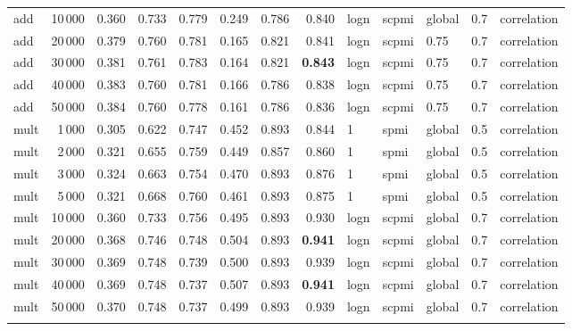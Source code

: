 \begin{tabular}{lrrrrrrrlllll}
     add &           10\,000 &      0.360 &  0.733 &  0.779 &  0.249 &      0.786 &      0.840 &  logn &  scpmi &  global &  0.7 &    correlation \\
     add &           20\,000 &      0.379 &  0.760 &  0.781 &  0.165 &      0.821 &      0.841 &  logn &  scpmi &    0.75 &  0.7 &    correlation \\
     add &           30\,000 &      0.381 &  0.761 &  0.783 &  0.164 &      0.821 &      \textbf{0.843} &  logn &  scpmi &    0.75 &  0.7 &    correlation \\
     add &           40\,000 &      0.383 &  0.760 &  0.781 &  0.166 &      0.786 &      0.838 &  logn &  scpmi &    0.75 &  0.7 &    correlation \\
     add &           50\,000 &      0.384 &  0.760 &  0.778 &  0.161 &      0.786 &      0.836 &  logn &  scpmi &    0.75 &  0.7 &    correlation \\ \addlinespace
    mult &            1\,000 &      0.305 &  0.622 &  0.747 &  0.452 &      0.893 &      0.844 &     1 &   spmi &  global &  0.5 &    correlation \\
    mult &            2\,000 &      0.321 &  0.655 &  0.759 &  0.449 &      0.857 &      0.860 &     1 &   spmi &  global &  0.5 &    correlation \\
    mult &            3\,000 &      0.324 &  0.663 &  0.754 &  0.470 &      0.893 &      0.876 &     1 &   spmi &  global &  0.5 &    correlation \\
    mult &            5\,000 &      0.321 &  0.668 &  0.760 &  0.461 &      0.893 &      0.875 &     1 &   spmi &  global &  0.5 &    correlation \\
    mult &           10\,000 &      0.360 &  0.733 &  0.756 &  0.495 &      0.893 &      0.930 &  logn &  scpmi &  global &  0.7 &    correlation \\
    mult &           20\,000 &      0.368 &  0.746 &  0.748 &  0.504 &      0.893 &      \textbf{0.941} &  logn &  scpmi &  global &  0.7 &    correlation \\
    mult &           30\,000 &      0.369 &  0.748 &  0.739 &  0.500 &      0.893 &      0.939 &  logn &  scpmi &  global &  0.7 &    correlation \\
    mult &           40\,000 &      0.369 &  0.748 &  0.737 &  0.507 &      0.893 &      \textbf{0.941} &  logn &  scpmi &  global &  0.7 &    correlation \\
    mult &           50\,000 &      0.370 &  0.748 &  0.737 &  0.499 &      0.893 &      0.939 &  logn &  scpmi &  global &  0.7 &    correlation \\ \addlinespace

\end{tabular}
